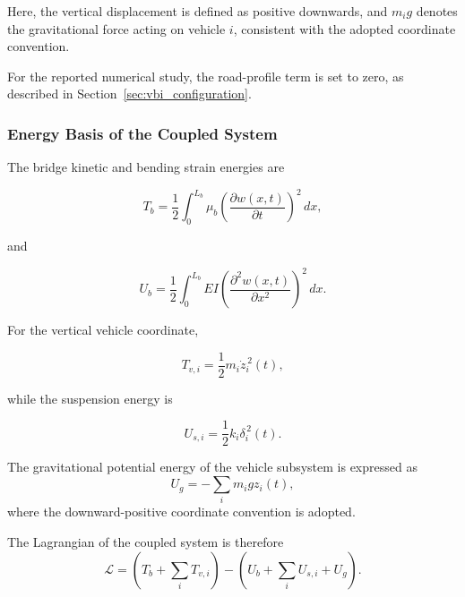 \documentclass[journal]{IEEEtran}
\begin{document}
Here, the vertical displacement is defined as positive
downwards, and $m_i g$ denotes the gravitational
force acting on vehicle $i$, consistent with the adopted
coordinate convention.



For the reported numerical study, the road-profile term is set to zero,
as described in Section~\ref{sec:vbi_configuration}.


\subsubsection{Energy Basis of the Coupled System}

The bridge kinetic and bending strain energies are

\begin{equation}
T_b
=
\frac{1}{2}
\int_{0}^{L_b}\mu_b
\left(
\frac{\partial w(x,t)}{\partial t}
\right)^2
\,dx,
\end{equation}

and

\begin{equation}
U_b
=
\frac{1}{2}
\int_{0}^{L_b}
EI
\left(
\frac{\partial^2 w(x,t)}{\partial x^2}
\right)^2
\,dx.
\end{equation}

For the vertical vehicle coordinate,

\begin{equation}
T_{v,i}
=
\frac{1}{2}
m_i
\dot{z}_i^{\,2}(t),
\end{equation}

while the suspension energy is

\begin{equation}
U_{s,i}
=
\frac{1}{2}
k_i
\delta_i^{\,2}(t).
\end{equation}



The gravitational potential energy of the vehicle
subsystem is expressed as
\begin{equation}
U_g=-\sum_i m_i g z_i(t),
\end{equation}
where the downward-positive coordinate convention
is adopted.

The Lagrangian of the coupled system is therefore
\begin{equation}
\mathcal{L}
=
\left(T_b+\sum_i T_{v,i}\right)
-
\left(U_b+\sum_i U_{s,i}+U_g\right).
\label{eq:coupled_lagrangian}
\end{equation}
\end{document}

